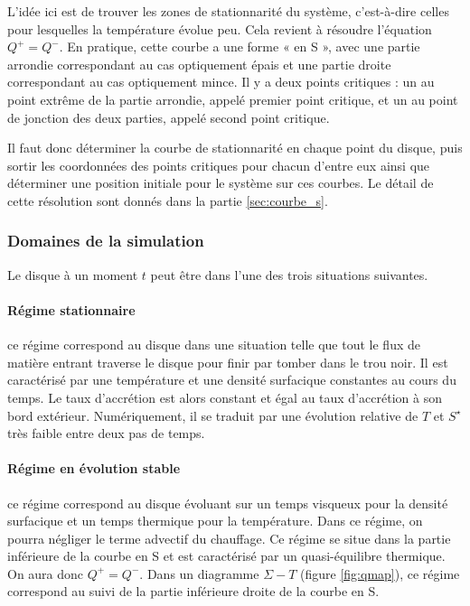 L’idée ici est de trouver les zones de stationnarité du système, c’est-à-dire
celles pour lesquelles la température évolue peu. Cela revient à résoudre
l’équation $Q^+ = Q^-$. En pratique, cette courbe a une forme « en S », avec
une partie arrondie correspondant au cas optiquement épais et une partie droite
correspondant au cas optiquement mince. Il y a deux points critiques : un au
point extrême de la partie arrondie, appelé premier point critique, et un au
point de jonction des deux parties, appelé second point critique.

Il faut donc déterminer la courbe de stationnarité en chaque point du disque,
puis sortir les coordonnées des points critiques pour chacun d’entre eux ainsi
que déterminer une position initiale pour le système sur ces courbes. Le détail de 
cette résolution sont donnés dans la partie \ref{sec:courbe_s}.

\subsubsection{Domaines de la simulation}

Le disque à un moment $t$ peut être dans l'une des trois situations suivantes.

\paragraph{Régime stationnaire} ce régime correspond au disque dans une
situation telle que tout le flux de matière entrant traverse le disque pour
finir par tomber dans le trou noir. Il est caractérisé par une température et
une densité surfacique constantes au cours du temps. Le taux d'accrétion est
alors constant et égal au taux d'accrétion à son bord extérieur. Numériquement,
il se traduit par une évolution relative de $T$ et $S^\star$ très faible entre
deux pas de temps. 

\paragraph{Régime en évolution stable} ce régime correspond au disque évoluant
sur un temps visqueux pour la densité surfacique et un temps thermique pour la
température. Dans ce régime, on pourra négliger le terme advectif du chauffage.
Ce régime se situe dans la partie inférieure de la courbe en S et est
caractérisé par un quasi-équilibre thermique. On aura donc $Q^+ = Q^-$. Dans un
diagramme $\Sigma-T$ (figure \ref{fig:qmap}), ce régime correspond au suivi de la partie inférieure
droite de la courbe en S. 

